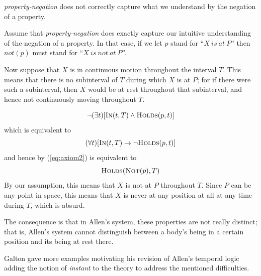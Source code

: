 \begin{exmp} \textit{property-negation} does not correctly capture what we understand by the negation of a property.

	Assume that \textit{property-negation} does exactly capture our intuitive understanding of the negation of a property. In that case, if we let $p$ stand for ``$X \  is \  at \ P$''
	then $not(p)$ must stand for ``$X \  is \  not \  at \ P$''.

	Now suppose that $X$ is in continuous motion throughout the interval $T$. This means that there is no subinterval of $T$ during which $X$ is at $P$;
	for if there were such a subinterval, then $X$ would be at rest throughout that subinterval, and hence not continuously moving throughout $T$.

	\begin{equation}
		\neg (\exists t)[\textsc{In}(t, T) \land \textsc{Holds}(p, t)]
	\end{equation}
	which is equivalent to
	\begin{equation}
		(\forall t)[\textsc{In}(t, T) \to \neg \textsc{Holds}(p, t)]
	\end{equation}
	and hence by (\ref{eq:axiom2}) is equivalent to
	\begin{equation}
		\textsc{Holds}(\textsc{Not}(p), T)
	\end{equation}
	By our assumption, this means that $X$ is not at $P$ throughout $T$. Since $P$ can be any point in space, this means that $X$ is never at any position at all at any time during $T$, which is absurd.

	The consequence is that in Allen's system, these properties are not really distinct; that is, Allen's system cannot distinguish between a body's being in a certain position and its being at rest there.
\end{exmp}

Galton gave more examples motivating his revision of Allen's temporal logic adding the notion of \textit{instant} to the theory to address the mentioned difficulties.

